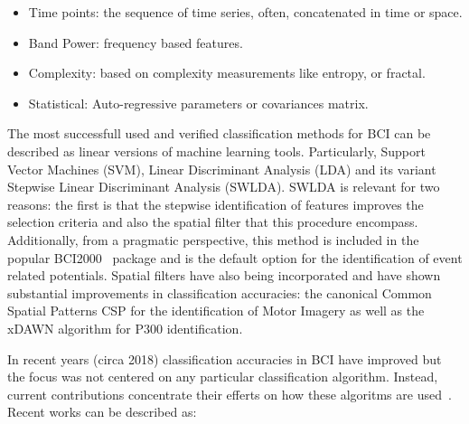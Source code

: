 \begin{itemize}
\item Time points:  the sequence of time series, often, concatenated in time or space.
\item Band Power: frequency based features.
\item Complexity:  based on complexity measurements like entropy, or fractal.
\item Statistical: Auto-regressive parameters or covariances matrix.
\end{itemize}

The most successfull used and verified classification methods for BCI \cite{Lotte2007} can be described as linear versions of machine learning tools.  Particularly, Support Vector Machines (SVM), Linear Discriminant Analysis (LDA) and its variant Stepwise Linear Discriminant Analysis (SWLDA).  SWLDA is relevant for two reasons:  the first is that the stepwise identification of features improves the selection criteria and also the spatial filter that this procedure encompass.  Additionally, from a pragmatic perspective, this method is included in the popular BCI2000~\cite{Schalk2004} package and is the default option for the identification of event related potentials.  Spatial filters have also being incorporated and have shown substantial improvements in classification accuracies: the canonical Common Spatial Patterns CSP for the identification of Motor Imagery as well as the xDAWN algorithm for P300 identification.

In recent years (circa 2018) classification accuracies in BCI have improved but the focus was not centered on any particular classification algorithm.  Instead, current contributions concentrate their efferts on how these algoritms are used~\cite{Lotte2018}.  Recent works can be described as:

